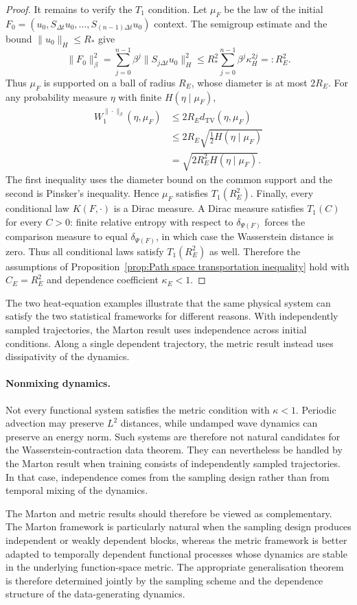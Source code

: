 \begin{proof}
It remains to verify the \(T_1\) condition. Let \(\mu_F\) be the law of the initial \(F_0=(u_0,S_{\Delta t}u_0,\ldots,S_{(n-1)\Delta t}u_0)\) context. The semigroup estimate and the bound \(\|u_0\|_H\leqslant R_*\) give
\[
\|F_0\|_\beta^2
=
\sum_{j=0}^{n-1}
\beta^j
\|S_{j\Delta t}u_0\|_H^2
\leqslant
R_*^2
\sum_{j=0}^{n-1}
\beta^j
\kappa_H^{2j}
=:R_E^2.
\]
Thus \(\mu_F\) is supported on a ball of radius \(R_E\), whose diameter is at most \(2R_E\).
For any probability measure \(\eta\) with finite \(H(\eta\mid\mu_F)\),
\[
\begin{aligned}
W_1^{\|\cdot\|_\beta}
(\eta,\mu_F)
&\leqslant
2R_E
d_{\mathrm{TV}}(\eta,\mu_F)
\\
&\leqslant
2R_E
\sqrt{
\frac12
H(\eta\mid\mu_F)
}
\\
&=
\sqrt{
2R_E^2
H(\eta\mid\mu_F)
}.
\end{aligned}
\]
The first inequality uses the diameter bound on the common support and the second is Pinsker's inequality. Hence \(\mu_F\) satisfies \(T_1(R_E^2)\). Finally, every conditional law \(K(F,\cdot)\) is a Dirac measure. A Dirac measure satisfies \(T_1(C)\) for every \(C>0\): finite relative entropy with respect to \(\delta_{\Psi(F)}\) forces the comparison measure to equal \(\delta_{\Psi(F)}\), in which case the Wasserstein distance is zero. Thus all conditional laws satisfy \(T_1(R_E^2)\) as well. Therefore the assumptions of Proposition~\ref{prop:Path space transportation inequality} hold with \(C_E=R_E^2\) and dependence coefficient \(\kappa_E<1\).
\end{proof}

The two heat-equation examples illustrate that the same physical system can satisfy the two statistical frameworks for different reasons. With independently sampled trajectories, the Marton result uses independence across initial conditions. Along a single dependent trajectory, the metric result instead uses dissipativity of the dynamics.

\paragraph{Nonmixing dynamics.}

Not every functional system satisfies the metric condition with \(\kappa<1\). Periodic advection may preserve \(L^2\) distances, while undamped wave dynamics can preserve an energy norm. Such systems are therefore not natural candidates for the Wasserstein-contraction data theorem.
They can nevertheless be handled by the Marton result when training consists of independently sampled trajectories. In that case, independence comes from the sampling design rather than from temporal mixing of the dynamics.

The Marton and metric results should therefore be viewed as complementary. The Marton framework is particularly natural when the sampling design produces independent or weakly dependent blocks, whereas the metric framework is better adapted to temporally dependent functional processes whose dynamics are stable in the underlying function-space metric. The appropriate generalisation theorem is therefore determined jointly by the sampling scheme and the dependence structure of the data-generating dynamics.
